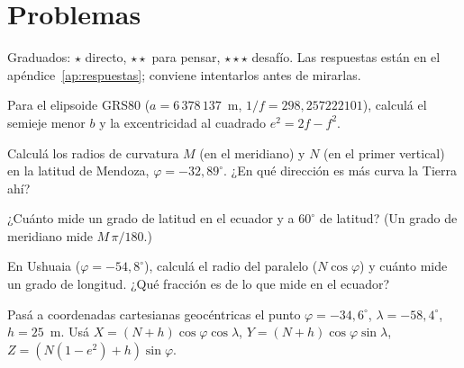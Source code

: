 \section{Problemas}\label{sec:problemas-14}

Graduados: \({\star}\) directo, \({\star}{\star}\) para pensar, \({\star}{\star}{\star}\) desafío. Las respuestas están en el apéndice~\ref{ap:respuestas}; conviene intentarlos antes de mirarlas.

\begin{problema}[\({\star}\)]\label{pb:14-1}
Para el elipsoide GRS80 (\(a=6\,378\,137\)~m, \(1/f=298{,}257222101\)), calculá el semieje menor \(b\) y la excentricidad al cuadrado \(e^2=2f-f^2\).
\end{problema}

\begin{problema}[\({\star}{\star}\)]\label{pb:14-2}
Calculá los radios de curvatura \(M\) (en el meridiano) y \(N\) (en el primer vertical) en la latitud de Mendoza, \(\varphi=-32{,}89^\circ\). ¿En qué dirección es más curva la Tierra ahí?
\end{problema}

\begin{problema}[\({\star}{\star}\)]\label{pb:14-3}
¿Cuánto mide un grado de latitud en el ecuador y a \(60^\circ\) de latitud? (Un grado de meridiano mide \(M\,\pi/180\).)
\end{problema}

\begin{problema}[\({\star}{\star}\)]\label{pb:14-4}
En Ushuaia (\(\varphi=-54{,}8^\circ\)), calculá el radio del paralelo (\(N\cos\varphi\)) y cuánto mide un grado de longitud. ¿Qué fracción es de lo que mide en el ecuador?
\end{problema}

\begin{problema}[\({\star}{\star}{\star}\)]\label{pb:14-5}
Pasá a coordenadas cartesianas geocéntricas el punto \(\varphi=-34{,}6^\circ\), \(\lambda=-58{,}4^\circ\), \(h=25\)~m. Usá \(X=(N+h)\cos\varphi\cos\lambda\), \(Y=(N+h)\cos\varphi\sin\lambda\), \(Z=(N(1-e^2)+h)\sin\varphi\).
\end{problema}
